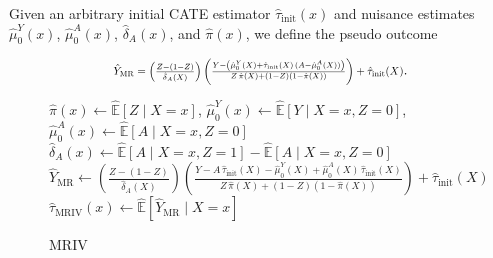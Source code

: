 \documentclass{article} %
\newcommand{\E}{\mathbb{E}}
\newcommand{\frameworkname}{MRIV\xspace}
\theoremstyle{definition}
\theoremstyle{plain}
\begin{document}
Given an arbitrary initial CATE estimator $\hat{\tau}_{\mathrm{init}}(x)$ and nuisance estimates $\hat{\mu}_0^Y(x)$, $\hat{\mu}_0^A(x)$, $\hat{\delta}_A(x)$, and $\hat{\pi}(x)$, we define the pseudo outcome

\vspace{-0.4cm}
\begin{equation}
\label{eq:pseudo_outcome}
    \resizebox{.6\hsize}{!}{$\hat{Y}_{\mathrm{\mathrm{MR}}} = \left(\frac{Z -(1-Z)}{\hat{\delta}_A(X)}\right) \left( \frac{Y - \left( \hat{\mu}_0^Y(X) + \hat{\tau}_{\mathrm{init}}(X) \, (A - \hat{\mu}_0^A(X)) \right) }{Z \, \hat{\pi}(X) + (1-Z) (1-\hat{\pi}(X))}\right) + \hat{\tau}_{\mathrm{init}}(X)$}.
\end{equation}
\vspace{-0.4cm}

\begin{figure}
\begin{minipage}{0.5\textwidth}
\vspace{-0.5cm}
\begin{algorithm}[H]
\DontPrintSemicolon
\caption{\frameworkname}
\label{alg:mr}
\scriptsize
{}
$\hat{\pi}(x) \gets \hat{\E}[Z \mid X = x] $, \quad $\hat{\mu}_0^Y(x) \gets \hat{\E}[Y \mid X = x, Z = 0]$, \quad  $\hat{\mu}_0^A(x) \gets \hat{\E}[A \mid X = x, Z = 0]$\;
$\hat{\delta}_A(x) \gets \hat{\E}[A \mid X = x, Z = 1] - \hat{\E}[A \mid X = x, Z = 0]$\;
$\hat{Y}_{\mathrm{\mathrm{MR}}} \gets \left( \frac{Z -(1-Z)}{\hat{\delta}_A(X)} \right) \left(\frac{Y - A \, \hat{\tau}_{\mathrm{init}}(X) - \hat{\mu}_0^Y(X) + \hat{\mu}_0^A(X) \, \hat{\tau}_{\mathrm{init}}(X)}{Z \, \hat{\pi}(X) + (1-Z) (1-\hat{\pi}(X))} \right) +\hat{\tau}_{\mathrm{init}}(X)$\;
$\hat{\tau}_{\mathrm{MRIV}}(x) \gets \hat{\E}[\hat{Y}_{\mathrm{\mathrm{MR}}} \mid X = x] $
\end{algorithm}
\vspace{-0.5cm}
\end{minipage}
\end{figure}
\end{document}
